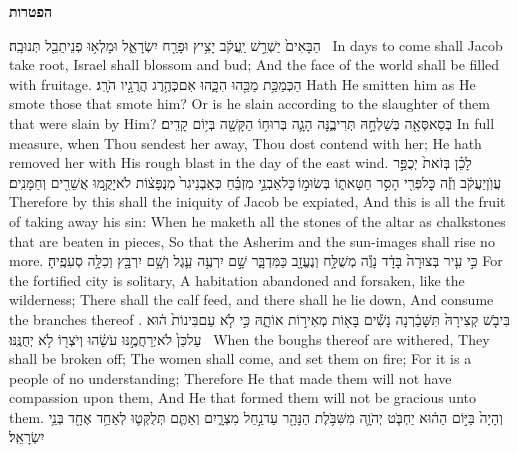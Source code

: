 \vspace{24pt}\LARGE \textbf{הפטרות} \normalsize\vspace{-16pt}
\label{haft_13}
\setcounter{chap}{27}
\setcounter{verse}{6}
{הַבָּאִים֙ יַשְׁרֵ֣שׁ יַֽעֲקֹ֔ב יָצִ֥יץ וּפָרַ֖ח יִשְׂרָאֵ֑ל וּמָלְא֥וּ פְנֵי\maqqaf תֵבֵ֖ל תְּנוּבָֽה׃ \petucha }
{In days to come shall Jacob take root, Israel shall blossom and bud; And the face of the world shall be filled with fruitage.}
{הַכְּמַכַּ֥ת מַכֵּ֖הוּ הִכָּ֑הוּ אִם\maqqaf כְּהֶ֥רֶג הֲרֻגָ֖יו הֹרָֽג׃}
{Hath He smitten him as He smote those that smote him? Or is he slain according to the slaughter of them that were slain by Him?}
{בְּסַאסְּאָ֖ה בְּשַׁלְחָ֣הּ תְּרִיבֶ֑נָּה הָגָ֛ה בְּרוּח֥וֹ הַקָּשָׁ֖ה בְּי֥וֹם קָדִֽים׃}
{In full measure, when Thou sendest her away, Thou dost contend with her; He hath removed her with His rough blast in the day of the east wind.}
{לָכֵ֗ן בְּזֹאת֙ יְכֻפַּ֣ר עֲוֺֽן\maqqaf יַעֲקֹ֔ב וְזֶ֕ה כׇּל\maqqaf פְּרִ֖י הָסִ֣ר חַטָּאת֑וֹ בְּשׂוּמ֣וֹ \legarmeh  כׇּל\maqqaf אַבְנֵ֣י מִזְבֵּ֗חַ כְּאַבְנֵי\maqqaf גִר֙ מְנֻפָּצ֔וֹת לֹא\maqqaf יָקֻ֥מוּ אֲשֵׁרִ֖ים וְחַמָּנִֽים׃}
{Therefore by this shall the iniquity of Jacob be expiated, And this is all the fruit of taking away his sin: When he maketh all the stones of the altar as chalkstones that are beaten in pieces, So that the Asherim and the sun-images shall rise no more.}
{כִּ֣י עִ֤יר בְּצוּרָה֙ בָּדָ֔ד נָוֶ֕ה מְשֻׁלָּ֥ח וְנֶעֱזָ֖ב כַּמִּדְבָּ֑ר שָׁ֣ם יִרְעֶ֥ה עֵ֛גֶל וְשָׁ֥ם יִרְבָּ֖ץ וְכִלָּ֥ה סְעִפֶֽיהָ׃}
{For the fortified city is solitary, A habitation abandoned and forsaken, like the wilderness; There shall the calf feed, and there shall he lie down, And consume the branches thereof .}
{בִּיבֹ֤שׁ קְצִירָהּ֙ תִּשָּׁבַ֔רְנָה נָשִׁ֕ים בָּא֖וֹת מְאִיר֣וֹת אוֹתָ֑הּ כִּ֣י לֹ֤א עַם\maqqaf בִּינוֹת֙ ה֔וּא עַל\maqqaf כֵּן֙ לֹא\maqqaf יְרַחֲמֶ֣נּוּ עֹשֵׂ֔הוּ וְיֹצְר֖וֹ לֹ֥א יְחֻנֶּֽנּוּ׃ \petucha }
{When the boughs thereof are withered, They shall be broken off; The women shall come, and set them on fire; For it is a people of no understanding; Therefore He that made them will not have compassion upon them, And He that formed them will not be gracious unto them.}
{וְהָיָה֙ בַּיּ֣וֹם הַה֔וּא יַחְבֹּ֧ט יְהֹוָ֛ה מִשִּׁבֹּ֥לֶת הַנָּהָ֖ר עַד\maqqaf נַ֣חַל מִצְרָ֑יִם וְאַתֶּ֧ם תְּלֻקְּט֛וּ לְאַחַ֥ד אֶחָ֖ד בְּנֵ֥י יִשְׂרָאֵֽל׃ \petucha }
